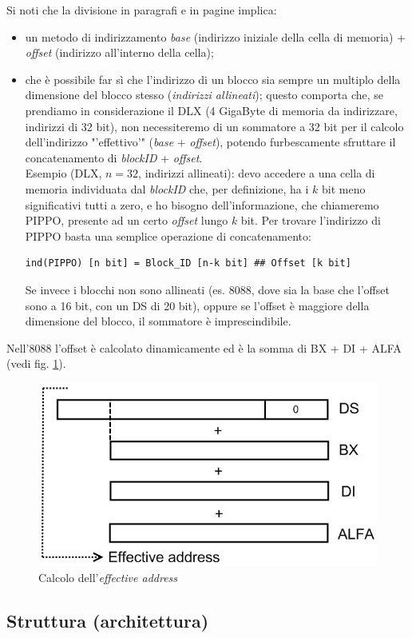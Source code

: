 Si noti che la divisione in paragrafi e in pagine implica:
\begin{itemize}
\item un metodo di indirizzamento \textit{base} (indirizzo iniziale della cella di memoria) + \textit{offset} (indirizzo all'interno della cella);
\item che è possibile far sì che l'indirizzo di un blocco sia sempre un multiplo della dimensione del blocco stesso (\textit{indirizzi allineati}); questo comporta che, se prendiamo in considerazione il DLX (4 GigaByte di memoria da indirizzare, indirizzi di 32 bit), non necessiteremo di un sommatore a 32 bit per il calcolo dell'indirizzo "'effettivo'" (\textit{base} + \textit{offset}), potendo furbescamente sfruttare il concatenamento di \textit{blockID} + \textit{offset}. \\
Esempio (DLX, $n=32$, indirizzi allineati): devo accedere a una cella di memoria individuata dal \textit{blockID} che, per definizione, ha i $k$ bit meno significativi tutti a zero, e ho bisogno dell'informazione, che chiameremo PIPPO, presente ad un certo \textit{offset} lungo $k$ bit. Per trovare l'indirizzo di PIPPO basta una semplice operazione di concatenamento:
\begin{verbatim}
ind(PIPPO) [n bit] = Block_ID [n-k bit] ## Offset [k bit]
\end{verbatim}
Se invece i blocchi non sono allineati (es. 8088, dove sia la base che l'offset sono a 16 bit, con un DS di 20 bit), oppure se l'offset è maggiore della dimensione del blocco, il sommatore è imprescindibile.
\end{itemize}

Nell'8088 l'offset è calcolato dinamicamente ed è la somma di BX + DI + ALFA (vedi fig. \ref{fig:effectiveAddress}).

\begin{figure}[!h]
\centering
\includegraphics[width=0.5\columnwidth]{img/effectiveAddress}
\caption{Calcolo dell'\textit{effective address}}
\label{fig:effectiveAddress}
\end{figure}

\subsection{Struttura (architettura)}
\label{sec:strutturaArchitettura}

